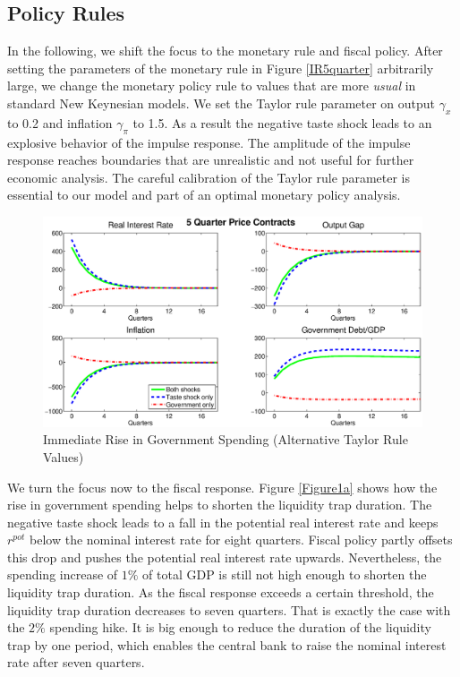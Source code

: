 \documentclass[12pt,a4paper,oneside,titlepage]{article}
\begin{document}
\subsection*{Policy Rules}
In the following, we shift the focus to the monetary rule and fiscal policy. After setting the parameters of the monetary rule in Figure \ref{IR5quarter} arbitrarily large, we change the monetary policy rule to values that are more \textit{usual} in standard New Keynesian models. We set the Taylor rule parameter on output $\gamma_x$ to 0.2 and inflation $\gamma_{\pi}$ to 1.5. As a result the negative taste shock leads to an explosive behavior of the impulse response. The amplitude of the impulse response reaches boundaries that are unrealistic and not useful for further economic analysis. The careful calibration of the Taylor rule parameter is essential to our model and part of an optimal monetary policy analysis.

\begin{figure}[!th]
\includegraphics[width=\textwidth]{Paperpics/Figure25quarternewtaylorrule}
\caption{Immediate Rise in Government Spending (Alternative Taylor Rule Values)}
\label{IR5quarternewtr}
\end{figure}

We turn the focus now to the fiscal response. Figure \ref{Figure1a} shows how the rise in government spending helps to shorten the liquidity trap duration. The negative taste shock leads to a fall in the potential real interest rate and keeps $r^{pot}$ below the nominal interest rate for eight quarters. Fiscal policy partly offsets this drop and pushes the potential real interest rate upwards. Nevertheless, the spending increase of $1\%$ of total GDP is still not high enough to shorten the liquidity trap duration. As the fiscal response exceeds a certain threshold, the liquidity trap duration decreases to seven quarters. That is exactly the case with the $2\%$ spending hike. It is big enough to reduce the duration of the liquidity trap by one period, which enables the central bank to raise the nominal interest rate after seven quarters.
\end{document}
